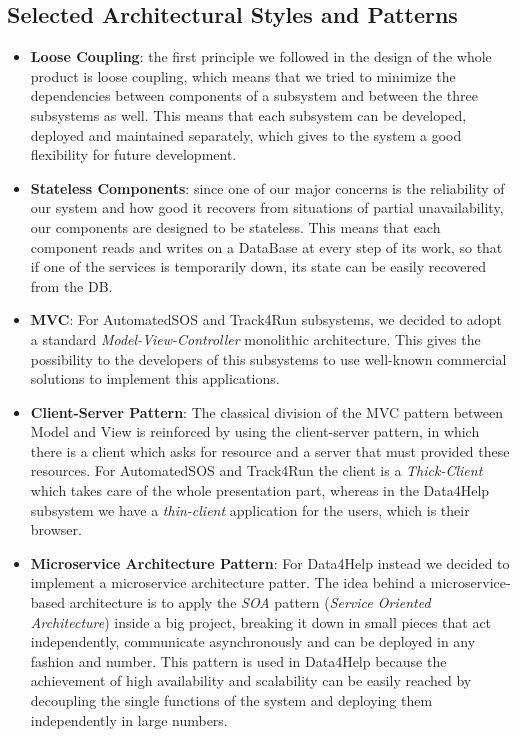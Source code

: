 \subsection{Selected Architectural Styles and Patterns}
\begin{itemize}
	\item \textbf{Loose Coupling}: the first principle we followed in the design of the whole product is loose coupling, which means that we tried to minimize the dependencies between components of a subsystem and between the three subsystems as well. This means that each subsystem can be developed, deployed and maintained separately, which gives to the system a good flexibility for future development.
	
	\item \textbf{Stateless Components}: since one of our major concerns is the reliability of our system and how good it recovers from situations of partial unavailability, our components are designed to be stateless. This means that each component reads and writes on a DataBase at every step of its work, so that if one of the services is temporarily down, its state can be easily recovered from the DB.
	
	\item \textbf{MVC}: For AutomatedSOS and Track4Run subsystems, we decided to adopt a standard \textit{Model-View-Controller} monolithic architecture. This gives the possibility to the developers of this subsystems to use well-known commercial solutions to implement this applications.
	
	\item \textbf{Client-Server Pattern}: The classical division of the MVC pattern between Model and View is reinforced by using the client-server pattern, in which there is a client which asks for resource and a server that must provided these resources. For AutomatedSOS and Track4Run the client is a \textit{Thick-Client} which takes care of the whole presentation part, whereas in the Data4Help subsystem we have a \textit{thin-client} application for the users, which is their browser.
	
	\item \textbf{Microservice Architecture Pattern}: For Data4Help instead we decided to implement a microservice architecture patter. The idea behind a microservice-based architecture is to apply the \textit{SOA} pattern (\textit{Service Oriented Architecture}) inside a big project, breaking it down in small pieces that act independently, communicate asynchronously and can be deployed in any fashion and number. This pattern is used in Data4Help because the achievement of high availability and scalability can be easily reached by decoupling the single functions of the system and deploying them independently in large numbers.
	

\end{itemize}
